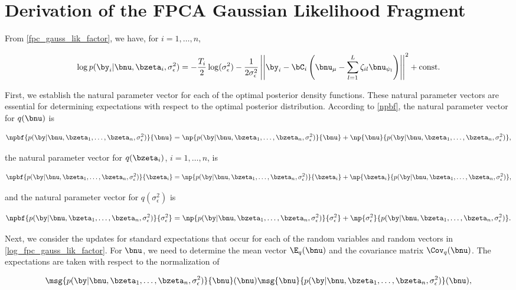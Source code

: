 \documentclass[12pt]{article}
\def\sigsqeps{\sigma^2_{\epsilon}}
\def\const{\text{const.}}
\def\numu{\bnu_\mu}
\newcommand\nupsi[1]{\bnu_{\psi_{#1}}}
\theoremstyle{plain}
\theoremstyle{definition}
\theoremstyle{remark}
\begin{document}
\section{Derivation of the FPCA Gaussian Likelihood Fragment}
\label{app:fpca_gauss_lik_frag}

From \eqref{fpc_gauss_lik_factor}, we have, for $i = 1, \dots, n$, 

\begin{equation}
	\log p (\by_i | \bnu, \bzeta_i, \sigsqeps) =
		-\frac{T_i}{2} \log (\sigsqeps)
		- \frac{1}{2\sigsqeps} \left|\left|
			\by_i - \bC_i \left( \numu - \sum_{l=1}^L \zeta_{il} \nupsi{l} \right)
		\right|\right|^2
		+ \const
\label{log_fpc_gauss_lik_factor}
\end{equation}

First, we establish the natural parameter vector for each of the optimal posterior density functions. These natural
parameter vectors are essential for determining expectations with respect to the optimal posterior distribution.
According to \eqref{npbf}, the natural parameter vector for $q (\bnu)$ is

\[
	\npbf{p (\by | \bnu, \bzeta_1, \dots, \bzeta_n, \sigsqeps)}{\bnu} =
		\np{p (\by | \bnu, \bzeta_1, \dots, \bzeta_n, \sigsqeps)}{\bnu}
		+ \np{\bnu}{p (\by | \bnu, \bzeta_1, \dots, \bzeta_n, \sigsqeps)},
\]

\noindent the natural parameter vector for $q (\bzeta_i)$, $i = 1, \dots, n$, is

\[
	\npbf{p (\by | \bnu, \bzeta_1, \dots, \bzeta_n, \sigsqeps)}{\bzeta_i} =
		\np{p (\by | \bnu, \bzeta_1, \dots, \bzeta_n, \sigsqeps)}{\bzeta_i}
		+ \np{\bzeta_i}{p (\by | \bnu, \bzeta_1, \dots, \bzeta_n, \sigsqeps)},
\]

\noindent and the natural parameter vector for $q(\sigsqeps)$ is

\[
	\npbf{p (\by | \bnu, \bzeta_1, \dots, \bzeta_n, \sigsqeps)}{\sigsqeps} =
		\np{p (\by | \bnu, \bzeta_1, \dots, \bzeta_n, \sigsqeps)}{\sigsqeps}
		+ \np{\sigsqeps}{p (\by | \bnu, \bzeta_1, \dots, \bzeta_n, \sigsqeps)}.
\]

Next, we consider the updates for standard expectations that occur for each of
the random variables and random vectors in
\eqref{log_fpc_gauss_lik_factor}. For $\bnu$, we need to determine the mean vector $\E_q (\bnu)$
and the covariance matrix $\Cov_q (\bnu)$. The expectations are taken with respect to the normalization
of

\[
	\msg{p (\by | \bnu, \bzeta_1, \dots, \bzeta_n, \sigsqeps)}{\bnu} (\bnu)
	\msg{\bnu}{p (\by | \bnu, \bzeta_1, \dots, \bzeta_n, \sigsqeps)} (\bnu),
\]
\end{document}
